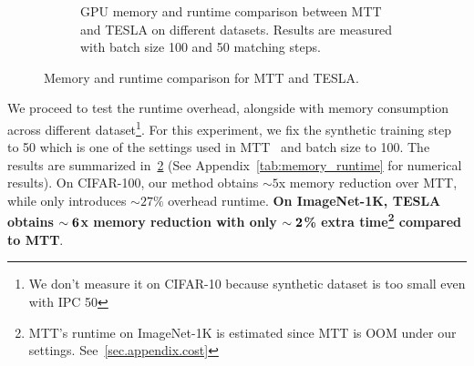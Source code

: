 \documentclass[10pt,twocolumn,letterpaper]{article}
\begin{document}
\begin{figure}
\begin{subfigure}[t]{0.8\linewidth}
    \caption{GPU memory and runtime comparison between MTT and TESLA on different datasets. Results are measured with batch size 100 and 50 matching steps.}
    \label{fig:memory_runtime}
\end{subfigure}
\caption{Memory and runtime comparison for MTT and TESLA. }
\vspace{-4mm}
\end{figure}
We proceed to test the runtime overhead, alongside with memory consumption across different dataset\footnote{We don't measure it on CIFAR-10 because synthetic dataset is too small even with IPC 50}.
For this experiment, we fix the synthetic training step to 50 which is one of the settings used in MTT~\cite{cazenavette2022dataset} and batch size to 100.
The results are summarized in~\cref{fig:memory_runtime} (See Appendix~\cref{tab:memory_runtime} for numerical results).
On CIFAR-100, our method obtains $\sim 5$x memory reduction over MTT, while only introduces $\sim27\%$ overhead runtime. \textbf{On ImageNet-1K, TESLA obtains $\bf{\sim 6}$x memory reduction with only  $\bf{\sim 2}$\% extra time\footnote{MTT's runtime on ImageNet-1K is estimated since MTT is OOM under our settings. See~\cref{sec.appendix.cost}} compared to MTT}.
\end{document}
